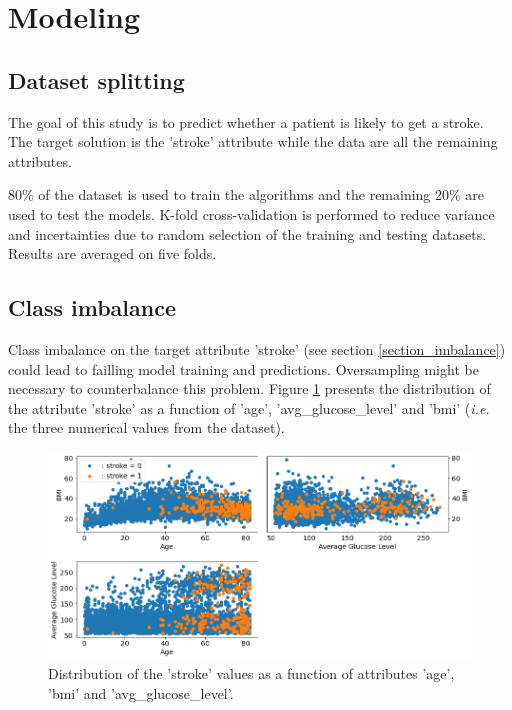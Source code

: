\section{Modeling}

\subsection{Dataset splitting}
The goal of this study is to predict whether a patient is likely to get a stroke. The target solution 
is the 'stroke' attribute while the data are all the remaining attributes.  

80\% of the dataset is used to train the algorithms and the remaining 20\% are used to test the 
models. K-fold cross-validation is performed to reduce variance and incertainties due to random 
selection of the training and testing datasets. Results are averaged on five folds.

\subsection{Class imbalance}
Class imbalance on the target attribute 'stroke' (see section \ref{section_imbalance}) could lead to 
failling model training and predictions. Oversampling might be necessary to counterbalance this 
problem. Figure \ref{distribution_stroke_01} presents the distribution of the attribute 'stroke' as a 
function of 'age', 'avg\_glucose\_level' and 'bmi' (\textit{i.e.} the three numerical values from the 
dataset).

\begin{figure}[H]
\centering
\includegraphics[scale=0.5]{../figures/plot_ageBMIAvgGlucoseLevel_stroke01.png}
\caption{Distribution of the 'stroke' values as a function of attributes 'age', 'bmi' and 'avg\_glucose\_level'.}
\label{distribution_stroke_01}
\end{figure}

